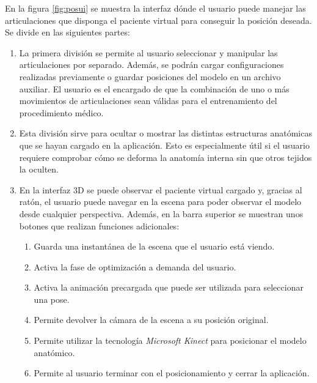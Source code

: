 En la figura \ref{fig:posui} se muestra la interfaz dónde el usuario puede manejar las articulaciones que disponga el paciente virtual para conseguir la posición deseada. Se divide en las siguientes partes: 
\begin{enumerate}
    \item La primera división se permite al usuario seleccionar y manipular las articulaciones por separado. %
    Además, se podrán cargar configuraciones realizadas previamente o guardar posiciones del modelo en un archivo auxiliar. El usuario es el encargado de que la combinación de uno o más movimientos de articulaciones sean válidas para el entrenamiento del procedimiento médico. 
    \item Esta división sirve para ocultar o mostrar las distintas estructuras anatómicas que se hayan cargado en la aplicación. Esto es especialmente útil si el usuario requiere comprobar cómo se deforma la anatomía interna sin que otros tejidos la oculten. %
    \item En la interfaz 3D se puede observar el paciente virtual cargado y, gracias al ratón, el usuario puede navegar en la escena para poder observar el modelo desde cualquier perspectiva. Además, en la barra superior se muestran unos botones que realizan funciones adicionales:
    \begin{enumerate}
   \item Guarda una instantánea de la escena que el usuario está viendo. 
   \item Activa la fase de optimización a demanda del usuario. 
   \item Activa la animación precargada que puede ser utilizada para seleccionar una pose. 
   \item Permite devolver la cámara de la escena a su posición original. 
   \item Permite utilizar la tecnología \emph{Microsoft Kinect} para posicionar el modelo anatómico.
   \item   Permite al usuario terminar con el posicionamiento y cerrar la aplicación.
    \end{enumerate}
    
\end{enumerate}




